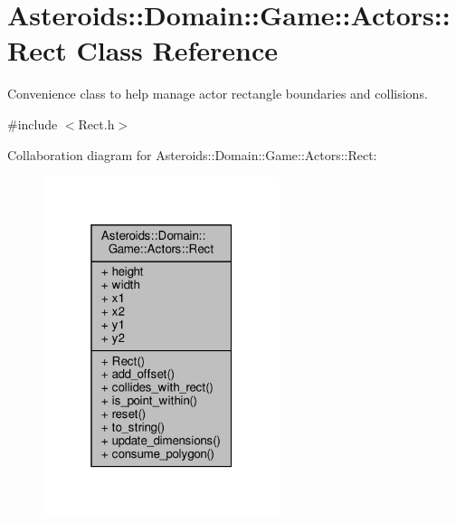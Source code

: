 \hypertarget{classAsteroids_1_1Domain_1_1Game_1_1Actors_1_1Rect}{}\section{Asteroids\+:\+:Domain\+:\+:Game\+:\+:Actors\+:\+:Rect Class Reference}
\label{classAsteroids_1_1Domain_1_1Game_1_1Actors_1_1Rect}


Convenience class to help manage actor rectangle boundaries and collisions.  




{\ttfamily \#include $<$Rect.\+h$>$}



Collaboration diagram for Asteroids\+:\+:Domain\+:\+:Game\+:\+:Actors\+:\+:Rect\+:\nopagebreak
\begin{figure}[H]
\begin{center}
\leavevmode
\includegraphics[width=196pt]{classAsteroids_1_1Domain_1_1Game_1_1Actors_1_1Rect__coll__graph}
\end{center}
\end{figure}
